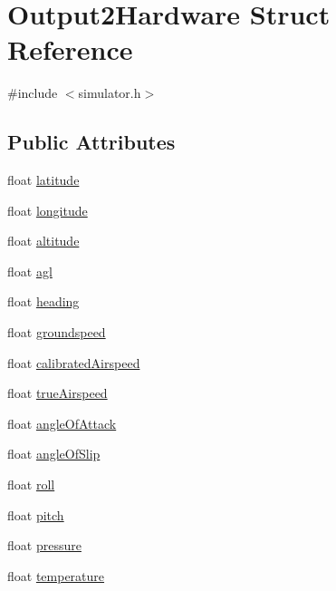 \hypertarget{struct_output2_hardware}{\section{\-Output2\-Hardware \-Struct \-Reference}
\label{struct_output2_hardware}
}


{\ttfamily \#include $<$simulator.\-h$>$}

\subsection*{\-Public \-Attributes}
\begin{DoxyCompactItemize}
\item 
float \hyperlink{group___h_i_t_l_plugin_ga3f453b19b12f4264ebffe76a1e8ee93d}{latitude}
\item 
float \hyperlink{group___h_i_t_l_plugin_gacf92ed715333315d33a77f42aa1ed71e}{longitude}
\item 
float \hyperlink{group___h_i_t_l_plugin_gafbb52a0b15f16cac6f1efbcae3702e96}{altitude}
\item 
float \hyperlink{group___h_i_t_l_plugin_ga40e8c62b6079618b6541408ce3dafe0c}{agl}
\item 
float \hyperlink{group___h_i_t_l_plugin_ga061c55e7f046212595dae9123b2589d8}{heading}
\item 
float \hyperlink{group___h_i_t_l_plugin_ga6cab485f36b93a2e86e248bcc6b240f1}{groundspeed}
\item 
float \hyperlink{group___h_i_t_l_plugin_gaa6ec37dae61764737236528ba5a2445c}{calibrated\-Airspeed}
\item 
float \hyperlink{group___h_i_t_l_plugin_gaca71e282fd00490c801905254e99ef54}{true\-Airspeed}
\item 
float \hyperlink{group___h_i_t_l_plugin_gaa698baa5c5eb08252558e7821e3d48dd}{angle\-Of\-Attack}
\item 
float \hyperlink{group___h_i_t_l_plugin_ga03a3c3371749ca83551e6f29e804a205}{angle\-Of\-Slip}
\item 
float \hyperlink{group___h_i_t_l_plugin_ga8f2327775c3342e13799a4ed6392f23f}{roll}
\item 
float \hyperlink{group___h_i_t_l_plugin_gaf92e2c90046782813af0a2fdd6e48bf4}{pitch}
\item 
float \hyperlink{group___h_i_t_l_plugin_ga9c1fdbe8d01c5346b54b71beff806a7e}{pressure}
\item 
float \hyperlink{group___h_i_t_l_plugin_ga925c7971d40c91b63e480e5f89096747}{temperature}

\end{DoxyCompactItemize}
